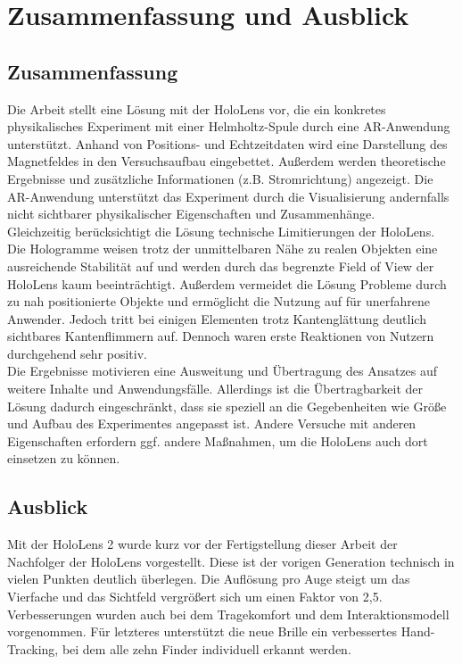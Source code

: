 \section{Zusammenfassung und Ausblick}
\label{sec-7}

\subsection{Zusammenfassung}
Die Arbeit stellt eine Lösung mit der HoloLens vor, die ein konkretes physikalisches Experiment mit einer Helmholtz-Spule durch eine AR-Anwendung unterstützt. Anhand von Positions- und Echtzeitdaten wird eine Darstellung des Magnetfeldes in den Versuchsaufbau eingebettet. Außerdem werden theoretische Ergebnisse und zusätzliche Informationen (z.B. Stromrichtung) angezeigt. Die AR-Anwendung unterstützt das Experiment durch die Visualisierung andernfalls nicht sichtbarer physikalischer Eigenschaften und Zusammenhänge.\\
\noindent\hspace*{5mm}
Gleichzeitig berücksichtigt die Lösung technische Limitierungen der HoloLens. Die Hologramme weisen trotz der unmittelbaren Nähe zu realen Objekten eine ausreichende Stabilität auf und werden durch das begrenzte Field of View der HoloLens kaum beeinträchtigt. Außerdem vermeidet die Lösung Probleme durch zu nah positionierte Objekte und ermöglicht die Nutzung auf für unerfahrene Anwender. Jedoch tritt bei einigen Elementen trotz Kantenglättung deutlich sichtbares Kantenflimmern auf. Dennoch waren erste Reaktionen von Nutzern durchgehend sehr positiv.\\
\noindent\hspace*{5mm}
Die Ergebnisse motivieren eine Ausweitung und Übertragung des Ansatzes auf weitere Inhalte und Anwendungsfälle. Allerdings ist die Übertragbarkeit der Lösung dadurch eingeschränkt, dass sie speziell an die Gegebenheiten wie Größe und Aufbau des Experimentes angepasst ist. Andere Versuche mit anderen Eigenschaften erfordern ggf. andere Maßnahmen, um die HoloLens auch dort einsetzen zu können.

\subsection{Ausblick}
Mit der HoloLens 2 wurde kurz vor der Fertigstellung dieser Arbeit der Nachfolger der HoloLens vorgestellt. Diese ist der vorigen Generation technisch in vielen Punkten deutlich überlegen. Die Auflösung pro Auge steigt um das Vierfache und das Sichtfeld vergrößert sich um einen Faktor von 2,5. Verbesserungen wurden auch bei dem Tragekomfort und dem Interaktionsmodell vorgenommen. Für letzteres unterstützt die neue Brille ein verbessertes Hand-Tracking, bei dem alle zehn Finder individuell erkannt werden.\\

